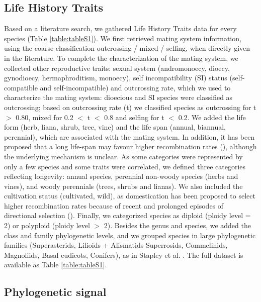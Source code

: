 \documentclass{article}
\begin{document}
\subsection*{Life History Traits}


 Based on a literature search, we gathered Life History Traits data for every species (Table \ref{table:tableS1}). We first retrieved mating system information, using the coarse classification outcrossing / mixed / selfing, when directly given in the literature. To complete the characterization of the mating system, we collected other reproductive traits: sexual system (andromonoecy, dioecy, gynodioecy, hermaphroditism, monoecy), self incompatibility (SI) status (self-compatible and self-incompatible) and outcrossing rate, which we used to characterize the mating system: dioecious and SI species were classified as outcrossing; based on outcrossing rate (t) we classified species as outcrossing for t $>$ 0.80, mixed for 0.2 $<$ t $<$ 0.8 and selfing for t $<$ 0.2. We added the life form (herb, liana, shrub, tree, vine) and the life span (annual, biannual, perennial), which are associated with the mating system. In addition, it has been proposed that a long life-span may favour higher recombination rates (\cite{burtMammalianChiasmaFrequencies1987}), although the underlying mechanism is unclear. As some categories were represented by only a few species and some traits were correlated, we defined three categories reflecting longevity: annual species, perennial non-woody species (herbs and vines), and woody perennials (trees, shrubs and lianas). We also included the cultivation status (cultivated, wild), as domestication has been proposed to select higher recombination rates because of recent and prolonged episodes of directional selection (\cite{ross-ibarraGenomeSizeRecombination2007a,burtMammalianChiasmaFrequencies1987}). Finally, we categorized species as diploid (ploidy level = 2) or polyploid (ploidy level $>$ 2). Besides the genus and species, we added the class and family phylogenetic levels, and we grouped species in large phylogenetic families (Superasterids, Lilioids + Alismatids Superrosids, Commelinids, Magnoliids, Basal eudicots, Conifers), as in Stapley et al. \citeyear{stapleyVariationRecombinationFrequency2017}. The full dataset is available as Table \ref{table:tableS1}.

 
\subsection*{Phylogenetic signal}
\end{document}
